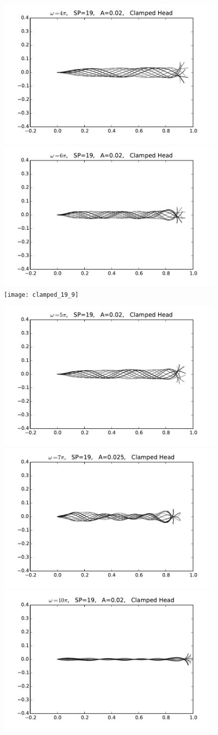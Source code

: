 \begin{figure}
  \includegraphics[width=.3\textwidth]{clamped_19_4}
  \hfill
  \includegraphics[width=.3\textwidth]{clamped_19_6}
  \hfill
  \texttt{[image: clamped\_19\_9]}



  \includegraphics[width=.3\textwidth]{clamped_19_5}
  \hfill
  \includegraphics[width=.3\textwidth]{clamped_19_7}
  \hfill
  \includegraphics[width=.3\textwidth]{clamped_19_10}
  \label{fig:clamped-head}
\end{figure}


